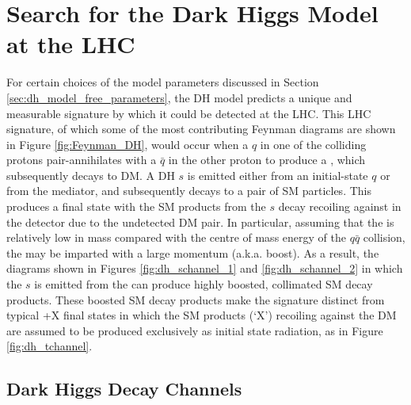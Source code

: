 \section{Search for the Dark Higgs Model at the LHC}
\label{sec:dh_search_lhc}

For certain choices of the model parameters discussed in Section \ref{sec:dh_model_free_parameters}, the DH model predicts a unique and measurable signature by which it could be detected at the LHC. This LHC signature, of which some of the most contributing Feynman diagrams are shown in Figure \ref{fig:Feynman_DH}, would occur when a \(q\) in one of the colliding protons pair-annihilates with a \(\bar{q}\) in the other proton to produce a \Zprime, which subsequently decays to DM. A DH \(s\) is emitted either from an initial-state \(q\) or from the \Zprime mediator, and subsequently decays to a pair of SM particles. This produces a final state with the SM products from the \(s\) decay recoiling against \met in the detector due to the undetected DM pair. In particular, assuming that the \Zprime is relatively low in mass compared with the centre of mass energy of the \(q\bar{q}\) collision, the \Zprime may be imparted with a large momentum (a.k.a. boost). As a result, the diagrams shown in Figures \ref{fig:dh_schannel_1} and \ref{fig:dh_schannel_2} in which the \(s\) is emitted from the \Zprime can produce highly boosted, collimated SM decay products. These boosted SM decay products make the signature distinct from typical \met+X final states in which the SM products (`X') recoiling against the DM are assumed to be produced exclusively as initial state radiation, as in Figure \ref{fig:dh_tchannel}.

\subsection{Dark Higgs Decay Channels}

